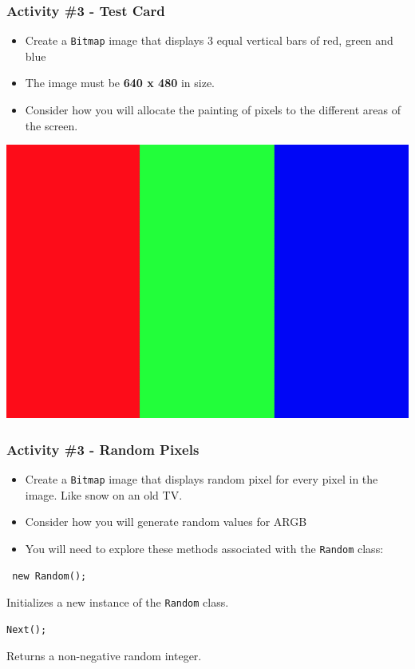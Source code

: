 \begin{frame}[fragile]
	\frametitle{Activity \#3 - Test Card}

\begin{itemize}		
	\item Create a \texttt{Bitmap} image that displays 3 equal vertical bars of red, green and blue
	\item The image must be \textbf{640 x 480} in size.
	\item Consider how you will allocate the painting of pixels to the different areas of the screen. 

\end{itemize}
	
\center\includegraphics[scale=0.16]{testCard}

\end{frame}

\begin{frame}[fragile]
	\frametitle{Activity \#3 - Random Pixels}

\begin{itemize}		
	\item Create a \texttt{Bitmap} image that displays random pixel for every pixel in the image. Like snow on an old TV.
	\item Consider how you will generate random values for ARGB
	\item You will need to explore these methods associated with the \texttt{Random} class:
	
\end{itemize}
	
\begin{lstlisting}
 new Random();
\end{lstlisting}
Initializes a new instance of the \texttt{Random} class.
\begin{lstlisting}
Next();
\end{lstlisting}
Returns a non-negative random integer.

\end{frame}

